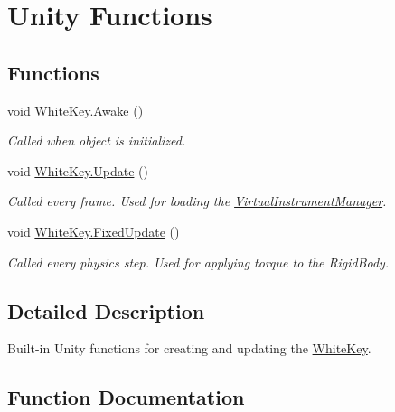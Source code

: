 \hypertarget{group___white_key_unity}{}\section{Unity Functions}
\label{group___white_key_unity}
\subsection*{Functions}
\begin{DoxyCompactItemize}
\item 
void \hyperlink{group___white_key_unity_ga92c78e57e0ccc8cf2dec655676698b21}{White\+Key.\+Awake} ()
\begin{DoxyCompactList}\small\item\em Called when object is initialized. \end{DoxyCompactList}\item 
void \hyperlink{group___white_key_unity_ga160cb397de3ab7084247e7fede943cf7}{White\+Key.\+Update} ()
\begin{DoxyCompactList}\small\item\em Called every frame. Used for loading the \hyperlink{class_virtual_instrument_manager}{Virtual\+Instrument\+Manager}. \end{DoxyCompactList}\item 
void \hyperlink{group___white_key_unity_ga54ddd22238f4a46b2824eacb90430245}{White\+Key.\+Fixed\+Update} ()
\begin{DoxyCompactList}\small\item\em Called every physics step. Used for applying torque to the Rigid\+Body. \end{DoxyCompactList}\end{DoxyCompactItemize}


\subsection{Detailed Description}
Built-\/in Unity functions for creating and updating the \hyperlink{class_white_key}{White\+Key}. 

\subsection{Function Documentation}
\mbox{\label{group___white_key_unity_ga92c78e57e0ccc8cf2dec655676698b21}} 
